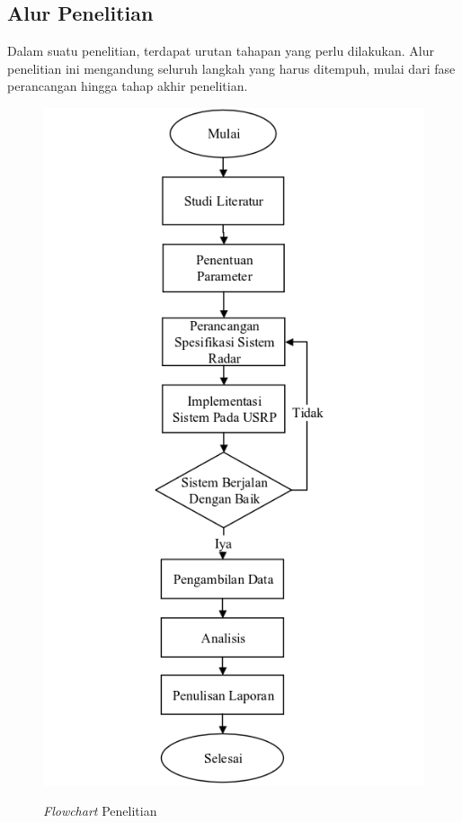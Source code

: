 \chapter{\babTiga}

\section{Alur Penelitian}
Dalam suatu penelitian, terdapat urutan tahapan yang perlu dilakukan. Alur penelitian ini mengandung seluruh langkah yang harus ditempuh, mulai dari fase perancangan hingga tahap akhir penelitian.
 \begin{figure}
	\begin{center}
		\includegraphics[scale=0.5]{pics/bab3/flowchart2.png} 
		\label{img:gambar 1}
		\caption[\textit{Flowchart} Penelitian]{\textit{Flowchart} Penelitian}
	\end{center}
\end{figure}
